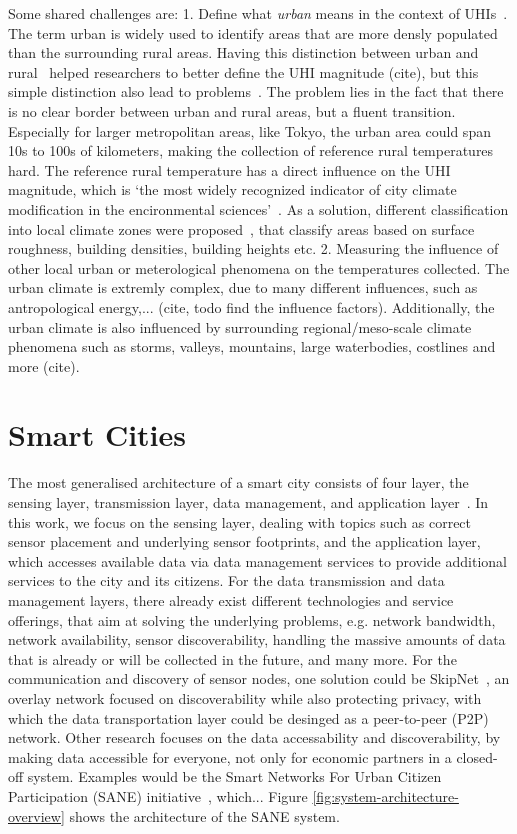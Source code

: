 Some shared challenges are: 1. Define what \textit{urban} means in the context of UHIs~\cite{stewart2009newly}. The term urban is widely used to identify areas that are more densly populated than the surrounding rural areas. Having this distinction between urban and rural~\cite{lowry1977empirical} helped researchers to better define the UHI magnitude (cite), but this simple distinction also lead to problems~\cite{stewart2011systematic}. The problem lies in the fact that there is no clear border between urban and rural areas, but a fluent transition. Especially for larger metropolitan areas, like Tokyo, the urban area could span 10s to 100s of kilometers, making the collection of reference rural temperatures hard. The reference rural temperature has a direct influence on the UHI magnitude, which is `the most widely recognized indicator of city climate modification in the encironmental sciences'~\cite{stewart2009newly}. As a solution, different classification into local climate zones were proposed~\cite{stewart2012local, stewart2009newly}, that classify areas based on surface roughness, building densities, building heights etc. 2. Measuring the influence of other local urban or meterological phenomena on the temperatures collected. The urban climate is extremly complex, due to many different influences, such as antropological energy,... (cite, todo find the influence factors). Additionally, the urban climate is also influenced by surrounding regional/meso-scale climate phenomena such as storms, valleys, mountains, large waterbodies, costlines and more (cite).



\section{Smart Cities}

The most generalised architecture of a smart city consists of four layer, the sensing layer, transmission layer, data management, and application layer~\cite{silva2018towards}. In this work, we focus on the sensing layer, dealing with topics such as correct sensor placement and underlying sensor footprints, and the application layer, which accesses available data via data management services to provide additional services to the city and its citizens. For the data transmission and data management layers, there already exist different technologies and service offerings, that aim at solving the underlying problems, e.g. network bandwidth, network availability, sensor discoverability, handling the massive amounts of data that is already or will be collected in the future, and many more. For the communication and discovery of sensor nodes, one solution could be SkipNet~\cite{harvey2002skipnet}, an overlay network focused on discoverability while also protecting privacy, with which the data transportation layer could be desinged as a peer-to-peer (P2P) network. Other research focuses on the data accessability and discoverability, by making data accessible for everyone, not only for economic partners in a closed-off system. Examples would be the Smart Networks For Urban Citizen Participation (SANE) initiative~\cite{bornholdt2019sane}, which... Figure \ref{fig:system-architecture-overview} shows the architecture of the SANE system.

